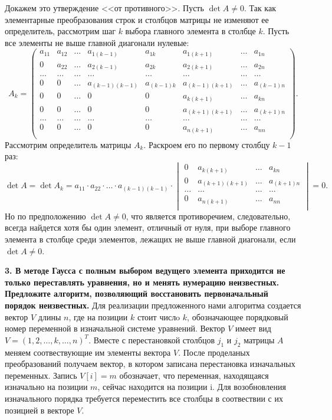\documentclass[12pt, a4paper]{article}
\begin{document}
	Докажем это утверждение <<от противного>>.  Пусть $\det A \ne 0$. Так как элементарные преобразования строк и столбцов матрицы не изменяют ее определитель, рассмотрим шаг $k$ выбора главного элемента в столбце $k$. Пусть все элементы не выше главной диагонали нулевые:
	\[ A_k = 
	\begin{pmatrix}
		a_{11} & a_{12} & \ldots & a_{1(k-1)} & a_{1k} & a_{1(k+1)} & \ldots & a_{1n}\\
		0 & a_{22} & \ldots & a_{2(k-1)} & a_{2k} & a_{2(k+1)} & \ldots & a_{2n}\\
		\ldots & \ldots & \ldots & \ldots & \ldots & \ldots &   \ldots & \ldots \\
		0 & 0 & \ldots & a_{(k-1)(k-1)} & a_{(k-1)k} & a_{(k-1)(k+1)} & \ldots & a_{(k-1)n}\\
		0 & 0 & \ldots & 0 & 0 & a_{k(k+1)} & \ldots & a_{kn}\\
		0 & 0 & \ldots & 0 & 0 & a_{(k+1)(k+1)} & \ldots & a_{(k+1)n}\\
		\ldots & \ldots & \ldots & \ldots & \ldots & \ldots &   \ldots & \ldots \\
		0 & 0 & \ldots & 0 & 0 & a_{n(k+1)} & \ldots & a_{nn}\\
	\end{pmatrix}.
	\]
	Рассмотрим определитель матрицы $A_k$. Раскроем его по первому столбцу $k-1$ раз:
	$$\det A=\det A_k = a_{11} \cdot a_{22} \cdot \ldots \cdot a_{(k-1)(k-1)} \cdot 
	\begin{vmatrix}
		0 & a_{k(k+1)} & \ldots & a_{kn}\\
		0 & a_{(k+1)(k+1)} & \ldots & a_{(k+1)n}\\
		\ldots &   \ldots & \ldots &\ldots\\
		0 & a_{n(k+1)} & \ldots & a_{nn}\\
	\end{vmatrix} = 0.
	$$
	Но по предположению $\det A \ne 0$, что является противоречием, следовательно, всегда найдется хотя бы один элемент, отличный от нуля, при выборе главного элемента в столбце среди элементов, лежащих не выше главной диагонали, если $\det A \ne 0$.
	
	\textbf{3. В методе Гаусса с полным выбором ведущего элемента приходится не только переставлять уравнения, но и менять нумерацию неизвестных. Предложите алгоритм, позволяющий восстановить первоначальный порядок неизвестных.  }
	Для реализации предложенного нами алгоритма создается вектор $V$ длины $n$,  где на позиции $k$ стоит числo $k$, обозначающее порядковый  номер переменной в изначальной системе уравнений. Вектор $V$ имеет вид $V=(1,2,\dots ,k,\dots ,n)^T$.  Вместе с перестановкой столбцов $j_1$ и  $j_2$ матрицы $A$ меняем соотвествующие им элементы вектора $V$. После проделаных преобразований получаем вектор, в котором записана перестановка изначальных переменных. Запись $V[i]=m$ обозначает, что переменная, находящаяся изначально на позиции $m$, сейчас находится на позиции i. Для возобновления изначального порядка требуется переместить все столбцы в соотвествии с их позицией в векторе $V$.
	
\end{document}
